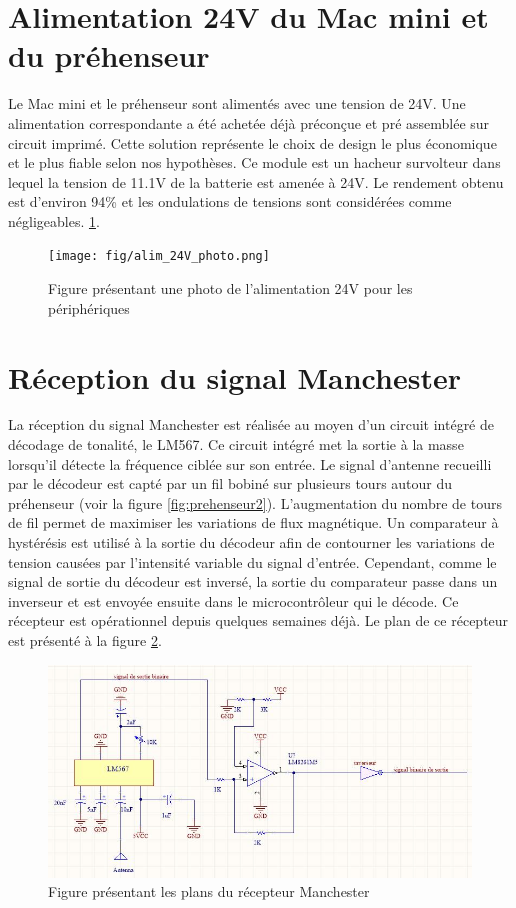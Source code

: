 \section{Alimentation 24V du Mac mini et du préhenseur}
Le Mac mini et le préhenseur sont alimentés avec une tension de 24V. Une alimentation correspondante a été achetée déjà préconçue et pré assemblée sur circuit imprimé. Cette solution représente le choix de design le plus économique et le plus fiable selon nos hypothèses. Ce module est un hacheur survolteur dans lequel la tension de 11.1V de la batterie est amenée à 24V. Le rendement obtenu est d’environ 94\% et les ondulations de tensions sont considérées comme négligeables. \ref{fig:alim24Vphoto}.

\begin{figure}[htbp]
\centering
\texttt{[image: fig/alim\_24V\_photo.png]}
\caption{Figure présentant une photo de l'alimentation 24V pour les périphériques}
\label{fig:alim24Vphoto}
\end{figure}

\section{Réception du signal Manchester}
La réception du signal Manchester est réalisée au moyen d'un circuit intégré de décodage de tonalité, le LM567. Ce circuit intégré met la sortie à la masse lorsqu’il détecte la fréquence ciblée sur son entrée. Le signal d'antenne recueilli par le décodeur est capté par un fil bobiné sur plusieurs tours autour du préhenseur (voir la figure \ref{fig:prehenseur2}). L'augmentation du nombre de tours de fil permet de maximiser les variations de flux magnétique.  Un comparateur à hystérésis est utilisé à la sortie du décodeur afin de contourner les variations de tension causées par l'intensité variable du signal d’entrée. Cependant, comme le signal de sortie du décodeur est inversé, la sortie du comparateur passe dans un inverseur et est envoyée ensuite dans le microcontrôleur qui le décode. Ce récepteur est opérationnel depuis quelques semaines déjà. Le plan de ce récepteur est présenté à la figure \ref{fig:manchester}.

\begin{figure}[htbp]
\centering
\includegraphics[scale=0.5]{fig/circuit_manchester.jpg}
\caption{Figure présentant les plans du récepteur Manchester}
\label{fig:manchester}
\end{figure}


